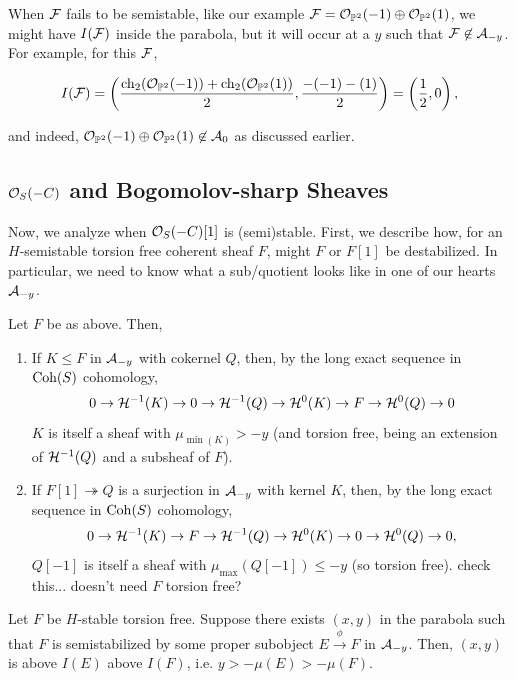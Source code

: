 \documentclass[12pt]{article}
\DeclareMathOperator{\chern}{ch}
\begin{document}
When $\mathcal{F}$ fails to be semistable, like our example $\mathcal{F}=\mathcal{O}_{\mathbb{P}^2}(-1) \oplus \mathcal{O}_{\mathbb{P}^2}(1)$, we might have $I(\mathcal{F})$ inside the parabola, but it will occur at a $y$ such that $\mathcal{F}\not\in \mathcal{A}_{-y}$. For example, for this $\mathcal{F}$,

\[I(\cF) = \left(\frac{\chern_2(\cO_{\P^2}(-1))+\chern_2(\cO_{\P^2}(1))}{2}, \frac{-(-1)-(1)}{2}\right) = \left(\frac{1}{2}, 0\right),\]

and indeed, $\mathcal{O}_{\mathbb{P}^2}(-1) \oplus \mathcal{O}_{\mathbb{P}^2}(1) \not\in \mathcal{A}_{0}$ as discussed earlier.



\subsection{\texorpdfstring{$\mathcal{O}_S(-C)$}{O(-C)} and Bogomolov-sharp Sheaves}

Now, we analyze when $\mathcal{O}_S(-C)[1]$ is (semi)stable. First, we describe how, for an $H$-semistable torsion free coherent sheaf $F$, might $F$ or $F[1]$ be destabilized. In particular, we need to know what a sub/quotient looks like in one of our hearts $\mathcal{A}_{-y}$.

\begin{lem}\label{subs-and-quots-of-ss-sheaves-in-tilts}
    Let $F$ be as above. Then,
    \begin{enumerate}[label=(\arabic*)]
        \item If $K\leq F$ in $\mathcal{A}_{-y}$ with cokernel $Q$, then, by the long exact sequence in $\operatorname{Coh}(S)$ cohomology,
        \[0\to \mathcal{H}^{-1}(K) \to 0 \to \mathcal{H}^{-1}(Q) \to \mathcal{H}^0(K) \to F \to \mathcal{H}^0(Q)\to 0\]
        $K$ is itself a sheaf with $\mu_{\min(K)}>-y$ (and torsion free, being an extension of $\mathcal{H}^{-1}(Q)$ and a subsheaf of $F$).

        \item If $F[1] \twoheadrightarrow Q$ is a surjection in $\mathcal{A}_{-y}$ with kernel $K$, then, by the long exact sequence in $\operatorname{Coh}(S)$ cohomology,
        \[0\to \mathcal{H}^{-1}(K) \to F \to \mathcal{H}^{-1}(Q) \to \mathcal{H}^0(K) \to 0 \to \mathcal{H}^0(Q)\to 0,\]
        $Q[-1]$ is itself a sheaf with $\mu_{\max}(Q[-1])\leq -y$ (so torsion free). {\color{red} check this... doesn't need $F$ torsion free?}
    \end{enumerate}
\end{lem}

\begin{lem}\label{H-slope-bound-for-destabilizers}
    Let $F$ be $H$-stable torsion free. Suppose there exists $(x,y)$ in the parabola such that $F$ is semistabilized by some proper subobject $E\xrightarrow{\phi} F$ in $\mathcal{A}_{-y}$. Then, $(x,y)$ is above $I(E)$ above $I(F)$, i.e. $y > -\mu(E) > -\mu(F)$.
\end{lem}
\end{document}
